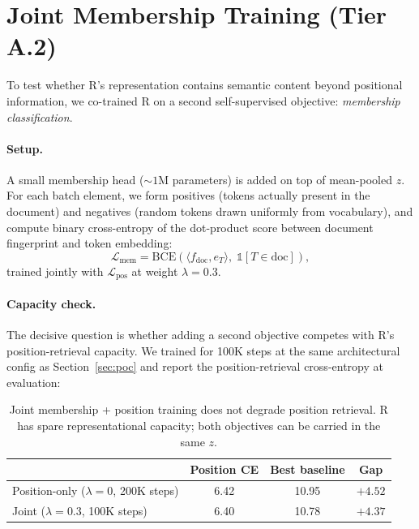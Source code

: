 \documentclass[10pt, twocolumn, a4paper]{article}
\begin{document}
\section{Joint Membership Training (Tier A.2)}
\label{sec:membership}

To test whether R's representation contains semantic content beyond
positional information, we co-trained R on a second self-supervised
objective: \emph{membership classification}.

\paragraph{Setup.} A small membership head ($\sim 1$M parameters) is added on
top of mean-pooled $z$. For each batch element, we form positives (tokens
actually present in the document) and negatives (random tokens drawn
uniformly from vocabulary), and compute binary cross-entropy of the
dot-product score between document fingerprint and token embedding:
\begin{equation}
\mathcal{L}_{\text{mem}} = \text{BCE}\!\left( \langle f_\text{doc}, e_T \rangle,\; \mathbb{1}[T \in \text{doc}] \right),
\end{equation}
trained jointly with $\mathcal{L}_{\text{pos}}$ at weight $\lambda = 0.3$.

\paragraph{Capacity check.} The decisive question is whether adding a second
objective competes with R's position-retrieval capacity. We trained for
100K steps at the same architectural config as Section~\ref{sec:poc} and
report the position-retrieval cross-entropy at evaluation:

\begin{table}[h]
\centering\small
\begin{tabular}{@{}lccc@{}}
\toprule
& \textbf{Position CE} & \textbf{Best baseline} & \textbf{Gap} \\
\midrule
Position-only ($\lambda{=}0$, 200K steps) & 6.42 & 10.95 & $+4.52$ \\
Joint ($\lambda{=}0.3$, 100K steps) & 6.40 & 10.78 & $+4.37$ \\
\bottomrule
\end{tabular}
\caption{Joint membership + position training does not degrade position retrieval. R has spare representational capacity; both objectives can be carried in the same $z$.}
\label{tab:membership_capacity}
\end{table}
\end{document}
